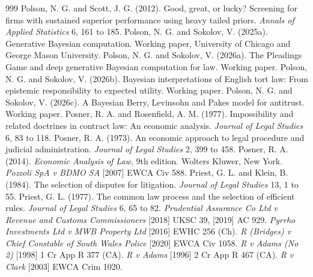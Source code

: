 \begin{thebibliography}{999}
 Polson, N. G. and Scott, J. G. (2012). Good, great, or lucky? Screening for firms with sustained superior performance using heavy tailed priors. \emph{Annals of Applied Statistics} 6, 161 to 185.
 Polson, N. G. and Sokolov, V. (2025a). Generative Bayesian computation. Working paper, University of Chicago and George Mason University.
 Polson, N. G. and Sokolov, V. (2026a). The Pleadings Game and deep generative Bayesian computation for law. Working paper.
 Polson, N. G. and Sokolov, V. (2026b). Bayesian interpretations of English tort law: From epistemic responsibility to expected utility. Working paper.
 Polson, N. G. and Sokolov, V. (2026c). A Bayesian Berry, Levinsohn and Pakes model for antitrust. Working paper.
 Posner, R. A. and Rosenfield, A. M. (1977). Impossibility and related doctrines in contract law: An economic analysis. \emph{Journal of Legal Studies} 6, 83 to 118.
 Posner, R. A. (1973). An economic approach to legal procedure and judicial administration. \emph{Journal of Legal Studies} 2, 399 to 458.
 Posner, R. A. (2014). \emph{Economic Analysis of Law}, 9th edition. Wolters Kluwer, New York.
 \emph{Pozzoli SpA v BDMO SA} [2007] EWCA Civ 588.
 Priest, G. L. and Klein, B. (1984). The selection of disputes for litigation. \emph{Journal of Legal Studies} 13, 1 to 55.
 Priest, G. L. (1977). The common law process and the selection of efficient rules. \emph{Journal of Legal Studies} 6, 65 to 82.
 \emph{Prudential Assurance Co Ltd v Revenue and Customs Commissioners} [2018] UKSC 39, [2019] AC 929.
 \emph{Pyrrho Investments Ltd v MWB Property Ltd} [2016] EWHC 256 (Ch).
 \emph{R (Bridges) v Chief Constable of South Wales Police} [2020] EWCA Civ 1058.
 \emph{R v Adams (No 2)} [1998] 1 Cr App R 377 (CA).
 \emph{R v Adams} [1996] 2 Cr App R 467 (CA).
 \emph{R v Clark} [2003] EWCA Crim 1020.

\end{thebibliography}
